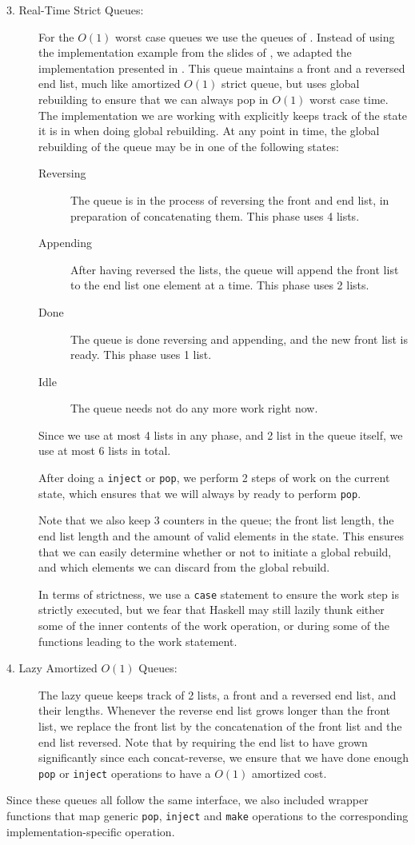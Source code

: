 \begin{description}
\item[3. Real-Time Strict Queues:] 
For the $O(1)$ worst case queues we use the queues of \citep{melville}. Instead of using the implementation example from the slides of \citep{gerth}, we adapted the implementation presented in \citep{okasaki}. This queue maintains a front and a reversed end list, much like amortized $O(1)$ strict queue, but uses global rebuilding to ensure that we can always pop in $O(1)$ worst case time. The implementation we are working with explicitly keeps track of the state it is in when doing global rebuilding. At any point in time, the global rebuilding of the queue may be in one of the following states:
\begin{description}
\item[Reversing] The queue is in the process of reversing the front and end list, in preparation of concatenating them. This phase uses 4 lists.
\item[Appending] After having reversed the lists, the queue will append the front list to the end list one element at a time. This phase uses 2 lists.
\item[Done] The queue is done reversing and appending, and the new front list is ready. This phase uses 1 list.
\item[Idle] The queue needs not do any more work right now.
\end{description}

Since we use at most 4 lists in any phase, and 2 list in the queue itself, we use at most 6 lists in total.

After doing a \texttt{inject} or \texttt{pop}, we perform 2 steps of work on the current state, which ensures that we will always by ready to perform \texttt{pop}.

Note that we also keep 3 counters in the queue; the front list length, the end list length and the amount of valid elements in the state. This ensures that we can easily determine whether or not to initiate a global rebuild, and which elements we can discard from the global rebuild.

In terms of strictness, we use a \texttt{case} statement to ensure the work step is strictly executed, but we fear that Haskell may still lazily thunk either some of the inner contents of the work operation, or during some of the functions leading to the work statement.

\item[4. Lazy Amortized $O(1)$ Queues:]

The lazy queue keeps track of 2 lists, a front and a reversed end list, and their lengths. Whenever the reverse end list grows longer than the front list, we replace the front list by the concatenation of the front list and the end list reversed. 
Note that by requiring the end list to have grown significantly since each concat-reverse, we ensure that we have done enough \texttt{pop} or \texttt{inject} operations to have a $O(1)$ amortized cost.

\end{description}

Since these queues all follow the same interface, we also included wrapper functions that map generic \texttt{pop}, \texttt{inject} and \texttt{make} operations to the corresponding implementation-specific operation.